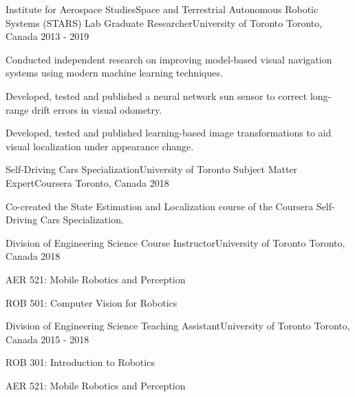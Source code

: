 \begin{cventries}
  \cventry
    {Institute for Aerospace Studies{\enskip\cdotp\enskip}Space and Terrestrial Autonomous Robotic Systems (STARS) Lab} %
    {Graduate Researcher{\enskip\cdotp\enskip}University of Toronto} %
    {Toronto, Canada} %
    {2013 - 2019} %
    {
      \begin{cvitems} %
        \item {Conducted independent research on improving model-based visual navigation systems using modern machine learning techniques.}
        \item {Developed, tested and published a neural network sun sensor to correct long-range drift errors in visual odometry.}
        \item {Developed, tested and published learning-based image transformations to aid visual localization under appearance change.}
      \end{cvitems}
    }
    
  \cventry
    {Self-Driving Cars Specialization{\enskip\cdotp\enskip}University of Toronto} %
    {Subject Matter Expert{\enskip\cdotp\enskip}Coursera} %
    {Toronto, Canada} %
    {2018} %
    {
      \begin{cvitems} %
        \item {Co-created the State Estimation and Localization course of the Coursera Self-Driving Cars Specialization.}
      \end{cvitems}
    }
    
  \cventry
    {Division of Engineering Science} %
    {Course Instructor{\enskip\cdotp\enskip}University of Toronto} %
    {Toronto, Canada} %
    {2018} %
    {
      \begin{cvitems} %
        \item {AER 521: Mobile Robotics and Perception}
        \item {ROB 501: Computer Vision for Robotics}
      \end{cvitems}
    }

  \cventry
    {Division of Engineering Science} %
    {Teaching Assistant{\enskip\cdotp\enskip}University of Toronto} %
    {Toronto, Canada} %
    {2015 - 2018} %
    {
      \begin{cvitems} %
        \item {ROB 301: Introduction to Robotics}
        \item {AER 521: Mobile Robotics and Perception}
      \end{cvitems}
    }



\end{cventries}
